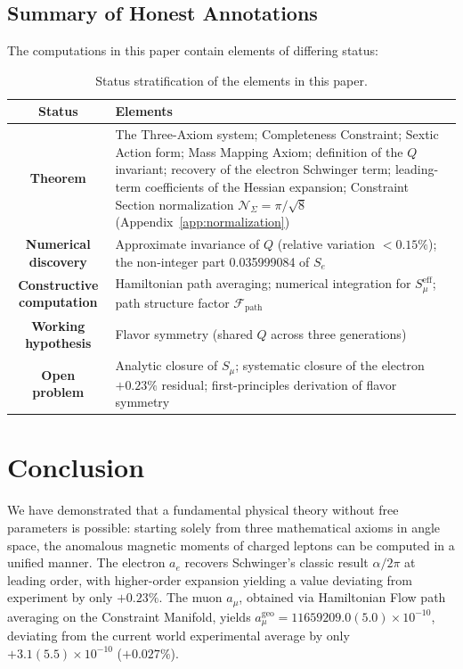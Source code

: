 \documentclass[aps,prd,reprint,nofootinbib]{revtex4-2}
\begin{document}
\subsection{Summary of Honest Annotations}

The computations in this paper contain elements of differing status:

\begin{table}[h]
\caption{Status stratification of the elements in this paper.}
\label{tab:status}
\begin{ruledtabular}
\begin{tabular}{c p{10cm}}
\hline
Status & Elements \\
\hline
\textbf{Theorem} & The Three-Axiom system; Completeness Constraint; Sextic Action form; Mass Mapping Axiom; definition of the $Q$ invariant; recovery of the electron Schwinger term; leading-term coefficients of the Hessian expansion; Constraint Section normalization $\mathcal{N}_\Sigma = \pi/\sqrt{8}$ (Appendix~\ref{app:normalization}) \\
\textbf{Numerical discovery} & Approximate invariance of $Q$ (relative variation $< 0.15\%$); the non-integer part 0.035999084 of $S_e$ \\
\textbf{Constructive computation} & Hamiltonian path averaging; numerical integration for $S_\mu^{\text{eff}}$; path structure factor $\mathcal{F}_{\text{path}}$ \\
\textbf{Working hypothesis} & Flavor symmetry (shared $Q$ across three generations) \\
\textbf{Open problem} & Analytic closure of $S_\mu$; systematic closure of the electron $+0.23\%$ residual; first-principles derivation of flavor symmetry \\
\hline
\end{tabular}
\end{ruledtabular}
\end{table}

\section{Conclusion}
\label{sec:conclusion}

We have demonstrated that a fundamental physical theory without free parameters is possible: starting solely from three mathematical axioms in angle space, the anomalous magnetic moments of charged leptons can be computed in a unified manner. The electron $a_e$ recovers Schwinger's classic result $\alpha/2\pi$ at leading order, with higher-order expansion yielding a value deviating from experiment by only $+0.23\%$. The muon $a_\mu$, obtained via Hamiltonian Flow path averaging on the Constraint Manifold, yields $a_\mu^{\text{geo}} = 11659209.0(5.0) \times 10^{-10}$, deviating from the current world experimental average by only $+3.1(5.5) \times 10^{-10}$ ($+0.027\%$).
\end{document}
